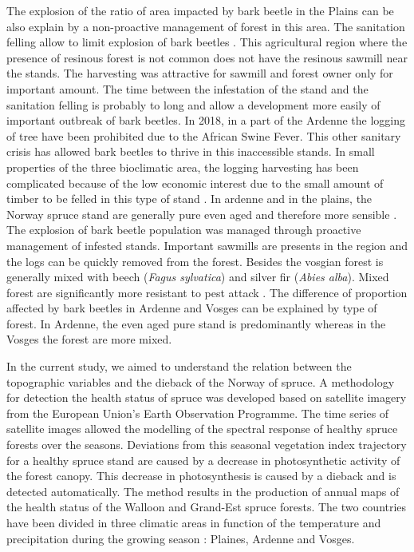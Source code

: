 \documentclass[3p,procedia]{elsarticle}
\begin{document}
The explosion of the ratio of area impacted by bark beetle in the Plains can be also explain by a non-proactive management of forest in this area.
The sanitation felling allow to limit explosion of bark beetles \citep{stadelmann_effects_2013}.
This agricultural region where the presence of resinous forest is not common does not have the resinous sawmill near the stands.
The harvesting was attractive for sawmill and forest owner only for important amount.  
The time between the infestation of the stand and the sanitation felling is probably to long and allow a development more easily of important outbreak of bark beetles.
In 2018, in a part of the Ardenne the logging of tree have been prohibited due to the African Swine Fever. 
This other sanitary crisis has allowed bark beetles to thrive in this inaccessible stands.
In small properties of the three bioclimatic area, the logging harvesting has been complicated because of the low economic interest due to the small amount of timber to be felled in this type of stand \citep{senecal_crise_2020}.
In ardenne and in the plains, the Norway spruce stand are generally pure even aged and therefore more sensible \citep{jactel_2021}.
The explosion of bark beetle population was managed through proactive management of infested stands.
Important sawmills are presents in the region and the logs can be quickly removed from the forest.
Besides the vosgian forest is generally mixed with beech (\textit{Fagus sylvatica}) and  silver fir (\textit{Abies alba}).
Mixed forest are significantly more resistant to pest attack \citep{jactel_2021}. 
The difference of proportion affected by bark beetles in Ardenne and Vosges can be explained by type of forest.
In Ardenne, the even aged pure stand is predominantly whereas in the Vosges  the forest are more mixed. 





\iffalse
In the current study, we aimed to understand the relation between the topographic variables and the dieback of the Norway of spruce.
A methodology for detection the health status of spruce was developed based on satellite imagery from the European Union's Earth Observation Programme. The time series of satellite images allowed the modelling of the spectral response of healthy spruce forests over the seasons. 
Deviations from this seasonal vegetation index trajectory for a healthy spruce stand are caused by a decrease in photosynthetic activity of the forest canopy.
This decrease in photosynthesis is caused by a dieback and is detected automatically.
The method results in the production of annual maps of the health status of the Walloon and Grand-Est spruce forests.
The two countries have been divided in three climatic areas in function of the temperature and precipitation during the growing season : Plaines, Ardenne and Vosges.
\end{document}

